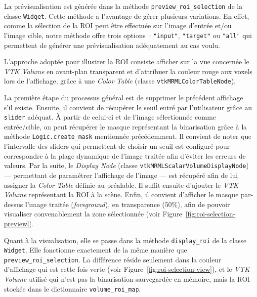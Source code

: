 \documentclass{article}
\begin{document}
{{{{                La prévisualisation est générée dans la méthode \texttt{preview\_roi\_selection} de la classe \texttt{Widget}.
                Cette méthode a l'avantage de gérer plusieurs variations. En effet, comme la sélection de la ROI peut être effectuée sur l'image d'entrée et/ou l'image cible, notre méthode offre trois options~: \texttt{"input"}, \texttt{"target"} ou \texttt{"all"} qui permettent de générer une prévisualisation adéquatement au cas voulu.

                L'approche adoptée pour illustrer la ROI consiste afficher sur la vue concernée le \textit{VTK Volume} en avant-plan transparent et d'attribuer la couleur rouge aux voxels lors de l'affichage, grâce à une \textit{Color Table} (classe \texttt{vtkMRMLColorTableNode}).

                La première étape du processus général est de supprimer le précédent affichage s'il existe.
                Ensuite, il convient de récupérer le seuil entré par l'utilisateur grâce au \texttt{slider} adéquat. À partir de celui-ci et de l'image sélectionnée comme entrée/cible, on peut récupérer le masque représentant la binarisation grâce à la méthode \texttt{Logic.create\_mask} mentionnée précédemment.
                Il convient de noter que l'intervalle des sliders qui permettent de choisir un seuil est configuré pour correspondre à la plage dynamique de l'image traitée afin d'éviter les erreurs de valeurs.
                Par la suite, le \textit{Display Node} (classe \texttt{vtkMRMLScalarVolumeDisplayNode}) --- permettant de paramétrer l'affichage de l'image --- est récupéré afin de lui assigner la \textit{Color Table} définie au préalable. Il suffit ensuite d'ajouter le \textit{VTK Volume} représentant la ROI à la scène.
                Enfin, il convient d'afficher le masque par-dessus l'image traitée (\textit{foreground}), en transparence (50\%), afin de pouvoir visualiser convenablement la zone sélectionnée (voir Figure~\ref{fig:roi-selection-preview}).

                \bigskip

                Quant à la visualisation, elle se passe dans la méthode \texttt{display\_roi} de la classe \texttt{Widget}.
                Elle fonctionne exactement de la même manière que \texttt{preview\_roi\_selection}. La différence réside seulement dans la couleur d'affichage qui est cette fois verte (voir Figure~\ref{fig:roi-selection-view}), et le \textit{VTK Volume} utilisé qui n'est pas la binarisation sauvegardée en mémoire, mais la ROI stockée dans le dictionnaire \texttt{volume\_roi\_map}.

}}}}
\end{document}
